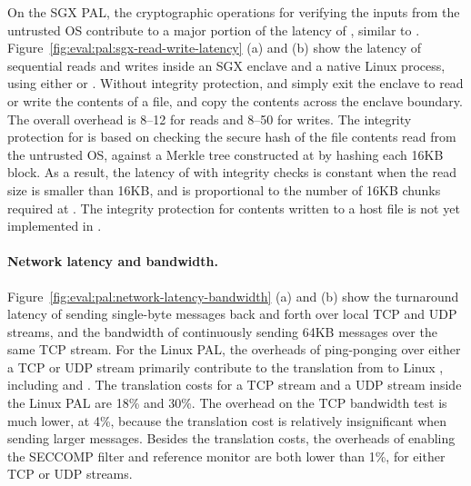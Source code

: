 On the SGX PAL, the cryptographic operations for verifying the inputs from the untrusted OS contribute
to a major portion of the latency of , similar to  . 
Figure~\ref{fig:eval:pal:sgx-read-write-latency} (a) and (b) show the latency of sequential reads and writes
inside an SGX enclave and a native Linux process,
using either \hostapis{} or \linuxapis{}.
Without integrity protection,
 and  simply exit the enclave
to read or write the contents of a file,
and copy the contents across the enclave boundary.
The overall overhead is 8--12 \usec{} for reads and 8--50 \usec{} for writes.
The integrity protection
for  is based on
checking the secure hash of the file contents read from the untrusted OS,
against a Merkle tree constructed at 
by hashing each 16KB block.
As a result, the latency of  with integrity checks is constant when the read size is smaller than 16KB, and is proportional to the number of 16KB chunks required at .
The integrity protection for contents written to a host file is not yet implemented in \graphenesgx{}.










\paragraph{Network latency and bandwidth.}
Figure~\ref{fig:eval:pal:network-latency-bandwidth} (a) and (b) show the turnaround latency of sending single-byte messages back and forth over local TCP and UDP streams, and the bandwidth of continuously sending 64KB messages over the same TCP stream.
For the Linux PAL,
the overheads of ping-ponging over either a TCP or UDP stream primarily contribute to the translation from \hostapis{} to Linux \linuxapis{}, including  and .
The translation costs for a TCP stream and a UDP stream inside the Linux PAL are \roughly{}18\% and \roughly{}30\%.
The overhead on the TCP bandwidth test is much lower,
at \roughly{}4\%, because the translation cost is relatively insignificant when sending larger messages. 
Besides the translation costs, the overheads of enabling the SECCOMP filter and reference monitor are both lower than 1\%, for either TCP or UDP streams.


